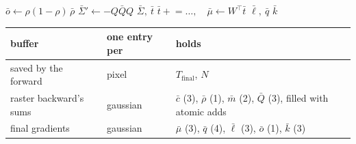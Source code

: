 \documentclass[11pt]{article}
\newcommand{\T}{^{\top}}
\begin{document}
\begin{algorithm}[H]
\caption{Project backward, one thread per gaussian}
\begin{algorithmic}[1]
\State $\bar o \gets \rho(1-\rho)\,\bar\rho$ 
\State $\bar\Sigma' \gets -Q\bar Q Q$ 
\State $\bar\Sigma,\ \bar t$ 
\State $\bar t \mathrel{+}= \dots,\quad \bar\mu \gets W\T\bar t$ 
\State $\bar\ell,\ \bar q$ 
\State $\bar k$ 
\end{algorithmic}
\end{algorithm}

\begin{center}
\begin{tabular}{@{}lll@{}}
\toprule
buffer & one entry per & holds \\
\midrule
saved by the forward & pixel & $T_{\text{final}}$, $N$ \\
raster backward's sums & gaussian & $\bar c$ (3), $\bar\rho$ (1), $\bar m$ (2), $\bar Q$ (3), filled with atomic adds \\
final gradients & gaussian & $\bar\mu$ (3), $\bar q$ (4), $\bar\ell$ (3), $\bar o$ (1), $\bar k$ (3) \\
\bottomrule
\end{tabular}
\end{center}
\end{document}
